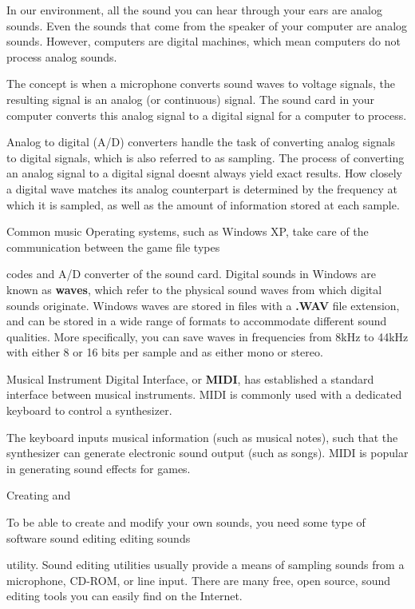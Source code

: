 \documentclass[
]{article}
\begin{document}
In our environment, all the sound you can hear through your ears are
analog sounds. Even the sounds that come from the speaker of your
computer are analog sounds. However, computers are digital machines,
which mean computers do not process analog sounds.

The concept is when a microphone converts sound waves to voltage
signals, the resulting signal is an analog (or continuous) signal. The
sound card in your computer converts this analog signal to a digital
signal for a computer to process.

Analog to digital (A/D) converters handle the task of converting analog
signals to digital signals, which is also referred to as sampling. The
process of converting an analog signal to a digital signal
doesn\textquotesingle t always yield exact results. How closely a
digital wave matches its analog counterpart is determined by the
frequency at which it is sampled, as well as the amount of information
stored at each sample.

Common music Operating systems, such as Windows XP, take care of the
communication between the game file types

codes and A/D converter of the sound card. Digital sounds in Windows are
known as \textbf{waves}, which refer to the physical sound waves from
which digital sounds originate. Windows waves are stored in files with a
\textbf{.WAV} file extension, and can be stored in a wide range of
formats to accommodate different sound qualities. More specifically, you
can save waves in frequencies from 8kHz to 44kHz with either 8 or 16
bits per sample and as either mono or stereo.

Musical Instrument Digital Interface, or \textbf{MIDI}, has established
a standard interface between musical instruments. MIDI is commonly used
with a dedicated keyboard to control a synthesizer.

The keyboard inputs musical information (such as musical notes), such
that the synthesizer can generate electronic sound output (such as
songs). MIDI is popular in generating sound effects for games.

Creating and

To be able to create and modify your own sounds, you need some type of
software sound editing editing sounds

utility. Sound editing utilities usually provide a means of sampling
sounds from a microphone, CD-ROM, or line input. There are many free,
open source, sound editing tools you can easily find on the Internet.
\end{document}
